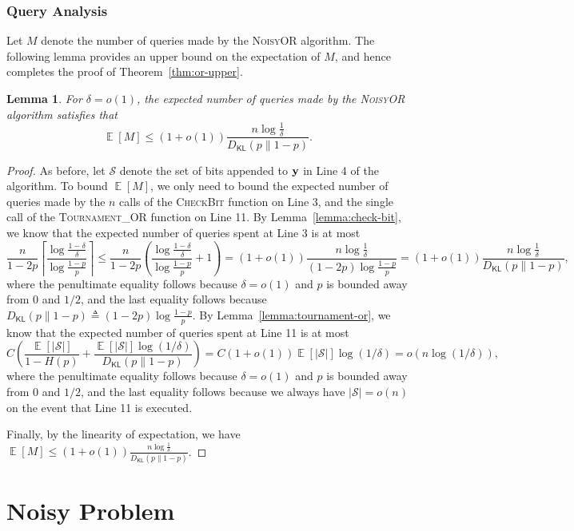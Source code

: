\documentclass[journal, onecolumn]{IEEEtran}
\theoremstyle{plain}
\newtheorem{lemma}[theorem]{Lemma}
\theoremstyle{definition}
\theoremstyle{remark}
\def\cs{{\mathcal S}}
\DeclareMathOperator\E{\mathbb{E}}
\def\DKL{{D_\mathsf{KL}(p\|1-p)}}
\newcommand{\sno}{\textsc{NoisyOR }}
\newcommand{\scb}{\textsc{CheckBit }}
\newcommand{\stouror}{\textsc{Tournament\_OR }}
\begin{document}
\subsubsection{Query Analysis}
Let $M$ denote the number of queries made by the \sno algorithm. The following lemma provides an upper bound on the expectation of $M$, and hence completes the proof of Theorem~\ref{thm:or-upper}.
\begin{lemma} \label{lemma:number-queries-or}
    For $\delta = o(1)$, the expected number of queries made by the \sno algorithm satisfies that
    \[
    \E[M]\le(1+o(1))\frac{n\log\frac{1}{\delta}}{\DKL}.
    \]
\end{lemma}
\begin{proof}
    As before, let $\cs$ denote the set of bits appended to ${\bf y}$ in Line 4 of the algorithm. To bound $\E[M]$, we only need to bound the expected number of queries made by the $n$ calls of the \scb function on Line 3, and the single call of the \stouror function on Line 11.
    By Lemma~\ref{lemma:check-bit}, we know that the expected number of queries spent at Line 3 is at most
    \[
    \frac{n}{1-2p}\left\lceil\frac{\log\frac{1-\delta}{\delta}}{\log\frac{1-p}{p}}\right\rceil\le \frac{n}{1-2p}\left(\frac{\log\frac{1-\delta}{\delta}}{\log\frac{1-p}{p}}+1\right)=(1+o(1))\frac{n\log\frac{1}{\delta}}{(1-2p)\log\frac{1-p}{p}}=(1+o(1))\frac{n\log \frac{1}{\delta}}{\DKL},
    \]
    where the penultimate equality follows because $\delta=o(1)$ and $p$ is bounded away from $0$ and $1/2$, and the last equality follows because $\DKL\triangleq (1-2p)\log\frac{1-p}{p}$.
    By Lemma~\ref{lemma:tournament-or}, we know that the expected number of queries spent at Line 11 is at most
    \[
        C\left(\frac{\E[|\mathcal{S}|]}{1-H(p)}+\frac{\E[|\mathcal{S}|]\log(1/\delta)}{\DKL}\right)=C(1+o(1))\E[|\mathcal{S}|]\log(1/\delta)=o(n\log(1/\delta)),
    \]
    where the penultimate equality follows because $\delta=o(1)$ and $p$ is bounded away from $0$ and $1/2$, and the last equality follows because we always have $|\mathcal{S}|=o(n)$ on the event that Line 11 is executed.

    Finally, by the linearity of expectation, we have $\E[M]\le (1+o(1))\frac{n\log \frac{1}{\delta}}{\DKL}$.
\end{proof}





\section{Noisy \maxn Problem} \label{sec:max}
\end{document}
